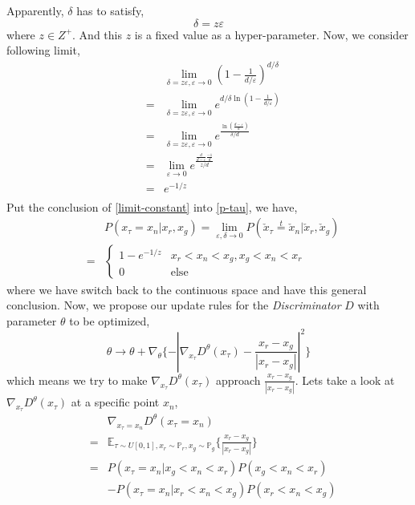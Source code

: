 \documentclass[letterpaper]{article} %
\begin{document}
Apparently, $\delta$ has to satisfy,
\begin{equation}\label{deltal-satisfy}
  \delta = z \varepsilon
\end{equation}
where $z \in Z^{+}$. And this $z$ is a fixed value as a hyper-parameter.
Now, we consider following limit,
\begin{eqnarray}\label{limit-constant}
    && \lim_{\delta=z\varepsilon,\varepsilon\rightarrow 0} (1-\frac{1}{d/\varepsilon})^{d/\delta} \nonumber\\
    \nonumber &=& \lim_{\delta=z\varepsilon,\varepsilon\rightarrow 0} e^{d/\delta \ln(1-\frac{1}{d/\varepsilon})} \\
    \nonumber &=& \lim_{\delta=z\varepsilon,\varepsilon\rightarrow 0} e^{\frac{\ln(\frac{d-\varepsilon}{d})}{\delta/d}} \\
    \nonumber &=& \lim_{\varepsilon\rightarrow0} e^{\frac{\frac{d}{d-\varepsilon}\frac{-1}{d}}{z/d}} \\
    \nonumber &=& e^{-1/z} \\
\end{eqnarray}
Put the conclusion of \eqref{limit-constant} into \eqref{p-tau}, we have,
\begin{eqnarray}\label{final-p-inter}
    && P(x_\tau=x_n|x_r,x_g) = \lim_{\varepsilon,\delta\rightarrow0} P(\check{x}_\tau\overset{t}{=}\check{x}_n|\check{x}_r,\check{x}_g) \nonumber\\
    &=&
    \begin{cases}
        1 - e^{-1/z} &\mbox{$x_r<x_n<x_g,x_g<x_n<x_r$}\\
        0 &\mbox{else}
    \end{cases}
\end{eqnarray}
where we have switch back to the continuous space and have this general conclusion.
Now, we propose our update rules for the \textit{Discriminator} $D$ with parameter $\theta$ to be optimized,
\begin{equation}\label{g-loss}
  \theta \longrightarrow \theta + \nabla_{\theta} \{ - |\nabla_{x_{\tau}}D^{\theta}(x_{\tau})-\frac{x_{r}-x_{g}}{|x_{r}-x_{g}|}|^2 \}
\end{equation}
which means we try to make $\nabla_{x_{\tau}}D^{\theta}(x_{\tau})$ approach $\frac{x_{r}-x_{g}}{|x_{r}-x_{g}|}$. Lets take a look at $\nabla_{x_{\tau}}D^{\theta}(x_{\tau})$ at a specific point $x_n$,
\begin{eqnarray}\label{d-at-xn}
    && \nabla_{x_{\tau}=x_n} D^{\theta}(x_{\tau}=x_n) \nonumber\\
    &=& \mathbb{E}_{\tau \sim U[0,1], x_r\sim\mathbb{P}_r,x_g\sim\mathbb{P}_g} \{\frac{x_{r}-x_{g}}{|x_{r}-x_{g}|}\} \nonumber\\
    &=& P(x_\tau=x_n|x_g<x_n<x_r) P(x_g<x_n<x_r) \nonumber\\
    && - P(x_\tau=x_n|x_r<x_n<x_g) P(x_r<x_n<x_g) \nonumber\\
\end{eqnarray}
\end{document}
